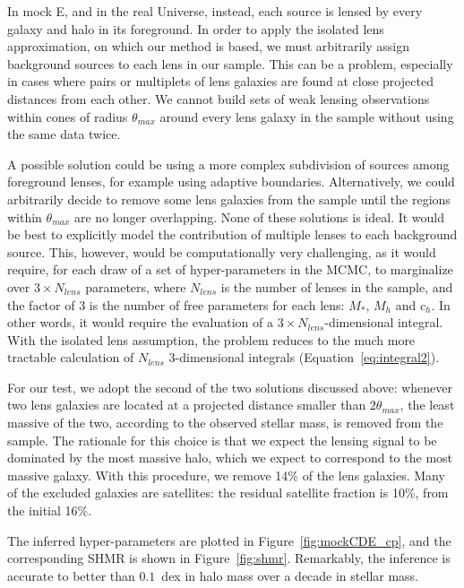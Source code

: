 \documentclass[usenatbib]{mnras}
\def\thetamax{\theta_{max}}
\def\mstar{M_*}
\def\mhalo{M_{h}}
\def\chalo{c_{h}}
\def\Fref#1{Figure~\ref{#1}\xspace}
\def\Eref#1{Equation~\ref{#1}\xspace}
\begin{document}
In mock E, and in the real Universe, instead, each source is lensed by every galaxy and halo in its foreground. 
In order to apply the isolated lens approximation, on which our method is based, we must arbitrarily assign background sources to each lens in our sample.
This can be a problem, especially in cases where pairs or multiplets of lens galaxies are found at close projected distances from each other.
We cannot build sets of weak lensing observations within cones of radius $\thetamax$ around every lens galaxy in the sample without using the same data twice.

A possible solution could be using a more complex subdivision of sources among foreground lenses, for example using adaptive boundaries.
Alternatively, we could arbitrarily decide to remove some lens galaxies from the sample until the regions within $\thetamax$ are no longer overlapping.
None of these solutions is ideal.
It would be best to explicitly model the contribution of multiple lenses to each background source. 
This, however, would be computationally very challenging, as it would require, for each draw of a set of hyper-parameters in the MCMC, to marginalize over $3\times N_{lens}$ parameters, where $N_{lens}$ is the number of lenses in the sample, and the factor of $3$ is the number of free parameters for each lens: $\mstar$, $\mhalo$ and $\chalo$. In other words, it would require the evaluation of a $3\times N_{lens}$-dimensional integral. With the isolated lens assumption, the problem reduces to the much more tractable calculation of $N_{lens}$ $3$-dimensional integrals (\Eref{eq:integral2}).

For our test, we adopt the second of the two solutions discussed above: whenever two lens galaxies are located at a projected distance smaller than $2\thetamax$, the least massive of the two, according to the observed stellar mass, is removed from the sample.
The rationale for this choice is that we expect the lensing signal to be dominated by the most massive halo, which we expect to correspond to the most massive galaxy.
With this procedure, we remove 14\% of the lens galaxies.
Many of the excluded galaxies are satellites: the residual satellite fraction is 10\%, from the initial 16\%.

The inferred hyper-parameters are plotted in \Fref{fig:mockCDE_cp}, and the corresponding SHMR is shown in \Fref{fig:shmr}. 
Remarkably, the inference is accurate to better than $0.1$~dex in halo mass over a decade in stellar mass.
\end{document}
